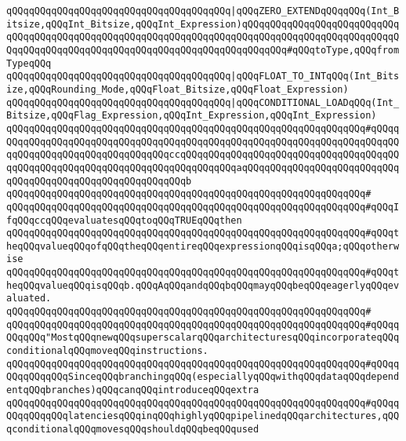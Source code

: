 \verb|qQQqqQQqqQQqqQQqqQQqqQQqqQQqqQQqqQQqqQQq|\verb#|qQQqZERO_EXTENDqQQqqQQq(Int_Bitsize,qQQqInt_Bitsize,qQQqInt_Expression)qQQqqQQqqQQqqQQqqQQqqQQqqQQqqQQqqQQqqQQqqQQqqQQqqQQqqQQqqQQqqQQqqQQqqQQqqQQqqQQqqQQqqQQqqQQqqQQqqQQqqQQqqQQqqQQqqQQqqQQqqQQqqQQqqQQqqQQqqQQqqQQqqQQq#\verb|#qQQqtoType,qQQqfromTypeqQQq|\newline
\verb|qQQqqQQqqQQqqQQqqQQqqQQqqQQqqQQqqQQqqQQq|\verb#|qQQqFLOAT_TO_INTqQQq(Int_Bitsize,qQQqRounding_Mode,qQQqFloat_Bitsize,qQQqFloat_Expression)#\newline
\newline
\newline
\newline
\verb|qQQqqQQqqQQqqQQqqQQqqQQqqQQqqQQqqQQqqQQq|\verb#|qQQqCONDITIONAL_LOADqQQq(Int_Bitsize,qQQqFlag_Expression,qQQqInt_Expression,qQQqInt_Expression)#\newline
\verb|qQQqqQQqqQQqqQQqqQQqqQQqqQQqqQQqqQQqqQQqqQQqqQQqqQQqqQQqqQQqqQQq#qQQqqQQqqQQqqQQqqQQqqQQqqQQqqQQqqQQqqQQqqQQqqQQqqQQqqQQqqQQqqQQqqQQqqQQqqQQqqQQqqQQqqQQqqQQqqQQqqQQqqQQqccqQQqqQQqqQQqqQQqqQQqqQQqqQQqqQQqqQQqqQQqqQQqqQQqqQQqqQQqqQQqqQQqqQQqqQQqqQQqqQQqaqQQqqQQqqQQqqQQqqQQqqQQqqQQqqQQqqQQqqQQqqQQqqQQqqQQqqQQqqQQqb|\newline
\verb|qQQqqQQqqQQqqQQqqQQqqQQqqQQqqQQqqQQqqQQqqQQqqQQqqQQqqQQqqQQqqQQq#|\newline
\verb|qQQqqQQqqQQqqQQqqQQqqQQqqQQqqQQqqQQqqQQqqQQqqQQqqQQqqQQqqQQqqQQq#qQQqIfqQQqccqQQqevaluatesqQQqtoqQQqTRUEqQQqthen|\newline
\verb|qQQqqQQqqQQqqQQqqQQqqQQqqQQqqQQqqQQqqQQqqQQqqQQqqQQqqQQqqQQqqQQq#qQQqtheqQQqvalueqQQqofqQQqtheqQQqentireqQQqexpressionqQQqisqQQqa;qQQqotherwise|\newline
\verb|qQQqqQQqqQQqqQQqqQQqqQQqqQQqqQQqqQQqqQQqqQQqqQQqqQQqqQQqqQQqqQQq#qQQqtheqQQqvalueqQQqisqQQqb.qQQqAqQQqandqQQqbqQQqmayqQQqbeqQQqeagerlyqQQqevaluated.|\newline
\verb|qQQqqQQqqQQqqQQqqQQqqQQqqQQqqQQqqQQqqQQqqQQqqQQqqQQqqQQqqQQqqQQq#|\newline
\verb|qQQqqQQqqQQqqQQqqQQqqQQqqQQqqQQqqQQqqQQqqQQqqQQqqQQqqQQqqQQqqQQq#qQQqqQQqqQQq"MostqQQqnewqQQqsuperscalarqQQqarchitecturesqQQqincorporateqQQqconditionalqQQqmoveqQQqinstructions.|\newline
\verb|qQQqqQQqqQQqqQQqqQQqqQQqqQQqqQQqqQQqqQQqqQQqqQQqqQQqqQQqqQQqqQQq#qQQqqQQqqQQqqQQqSinceqQQqbranchingqQQq(especiallyqQQqwithqQQqdataqQQqdependentqQQqbranches)qQQqcanqQQqintroduceqQQqextra|\newline
\verb|qQQqqQQqqQQqqQQqqQQqqQQqqQQqqQQqqQQqqQQqqQQqqQQqqQQqqQQqqQQqqQQq#qQQqqQQqqQQqqQQqlatenciesqQQqinqQQqhighlyqQQqpipelinedqQQqarchitectures,qQQqconditionalqQQqmovesqQQqshouldqQQqbeqQQqused|\newline

